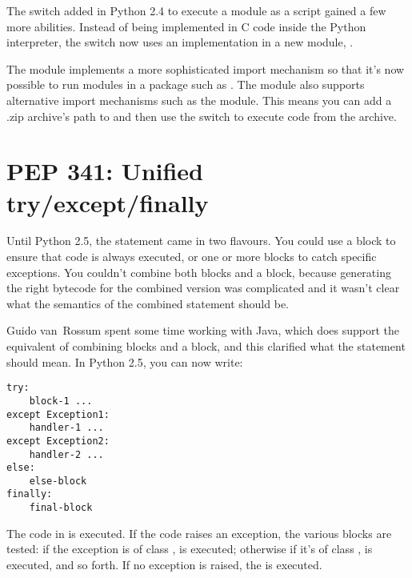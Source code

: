 \documentclass{howto}
\begin{document}
The  switch added in Python 2.4 to execute a module as
a script gained a few more abilities.  Instead of being implemented in
C code inside the Python interpreter, the switch now uses an
implementation in a new module, .

The  module implements a more sophisticated import
mechanism so that it's now possible to run modules in a package such
as .  The module also supports alternative
import mechanisms such as the  module.  This means
you can add a .zip archive's path to  and then use the
 switch to execute code from the archive.


\begin{seealso}


\end{seealso}


\section{PEP 341: Unified try/except/finally\label{pep-341}}

Until Python 2.5, the  statement came in two
flavours. You could use a  block to ensure that code
is always executed, or one or more  blocks to catch 
specific exceptions.  You couldn't combine both  blocks and a
 block, because generating the right bytecode for the
combined version was complicated and it wasn't clear what the
semantics of the combined statement should be.  

Guido van~Rossum spent some time working with Java, which does support the
equivalent of combining  blocks and a
 block, and this clarified what the statement should
mean.  In Python 2.5, you can now write:

\begin{verbatim}
try:
    block-1 ...
except Exception1:
    handler-1 ...
except Exception2:
    handler-2 ...
else:
    else-block
finally:
    final-block 
\end{verbatim}

The code in  is executed.  If the code raises an
exception, the various  blocks are tested: if the
exception is of class ,  is executed;
otherwise if it's of class ,  is
executed, and so forth.  If no exception is raised, the
 is executed.  
\end{document}
